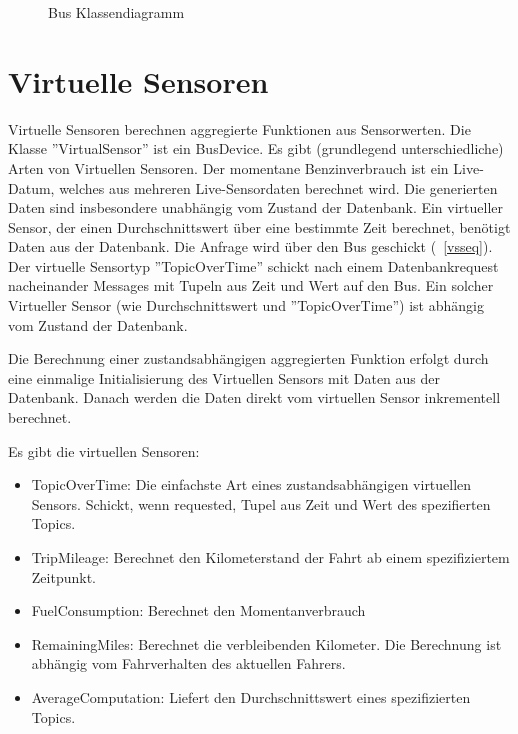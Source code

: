 \documentclass[entwurf.tex]{subfiles}
\begin{document}
  		\begin{figure}[H]
  			\begin{center}
  				\caption{Bus Klassendiagramm}
  			\end{center}
  		\end{figure}
  	
  	\newpage
  	\section{Virtuelle Sensoren}
		Virtuelle Sensoren berechnen aggregierte Funktionen aus Sensorwerten. Die Klasse ''VirtualSensor'' ist ein BusDevice. Es gibt (grundlegend unterschiedliche) Arten von Virtuellen Sensoren. Der momentane Benzinverbrauch ist ein Live-Datum, welches aus mehreren Live-Sensordaten berechnet wird. Die generierten Daten sind insbesondere unabhängig vom Zustand der Datenbank. Ein virtueller Sensor, der einen Durchschnittswert über eine bestimmte Zeit berechnet, benötigt Daten aus der Datenbank. Die Anfrage wird über den Bus geschickt (~\ref{vsseq}). Der virtuelle Sensortyp ''TopicOverTime'' schickt nach einem Datenbankrequest nacheinander Messages mit Tupeln aus Zeit und Wert auf den Bus. Ein solcher Virtueller Sensor (wie Durchschnittswert und ''TopicOverTime'') ist abhängig vom Zustand der Datenbank.

		Die Berechnung einer zustandsabhängigen aggregierten Funktion erfolgt durch eine einmalige Initialisierung des Virtuellen Sensors mit Daten aus der Datenbank. Danach werden die Daten direkt vom virtuellen Sensor inkrementell berechnet.

		Es gibt die virtuellen Sensoren:
		\begin{itemize}
			\item{TopicOverTime:} Die einfachste Art eines zustandsabhängigen virtuellen Sensors. Schickt, wenn requested, Tupel aus Zeit und Wert des spezifierten Topics.
			\item{TripMileage:} Berechnet den Kilometerstand der Fahrt ab einem spezifiziertem Zeitpunkt.
			\item{FuelConsumption:} Berechnet den Momentanverbrauch
			\item{RemainingMiles:} Berechnet die verbleibenden Kilometer. Die Berechnung ist abhängig vom Fahrverhalten des aktuellen Fahrers.
			\item{AverageComputation:} Liefert den Durchschnittswert eines spezifizierten Topics.
		\end{itemize}
\end{document}
